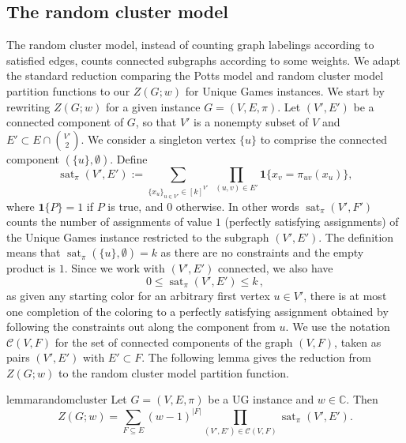 \documentclass[10pt,a4paper]{article}
\theoremstyle{definition}
\newcommand*{\comp}{\mathcal{C}}
\DeclareMathOperator{\sat}{sat}
\newcommand*{\indicator}[1]{\mathbf{1}\bm{\{}#1\bm{\}}}
\newcommand*{\CC}{\mathbb{C}}
\begin{document}
\subsection{The random cluster model}
%
The random cluster model, instead of counting graph labelings according to satisfied edges, counts connected subgraphs according to some weights. 
We adapt the standard reduction comparing the Potts model and random cluster model partition functions to our $Z(G;w)$ for Unique Games instances.
%
We start by rewriting $Z(G;w)$ for a given instance $G=(V,E,\pi)$. 
Let $(V',E')$ be a connected component of $G$, so that $V'$ is a nonempty subset of $V$ and $E'\subset E\cap \binom{V'}{2}$. 
We consider a singleton vertex $\{u\}$ to comprise the connected component $(\{u\},\emptyset)$. 
Define
\[
\sat_\pi(V',E'):=\sum_{\{x_u\}_{u\in V'}\in[k]^{V'}}\;\prod_{(u,v)\in E'}\indicator{x_v=\pi_{uv}(x_u)},
\]
where $\indicator{P}=1$ if $P$ is true, and $0$ otherwise. 
In other words $\sat_\pi(V',F')$ counts the number of assignments of value $1$ (perfectly satisfying assignments) of the Unique Games instance restricted to the subgraph $(V',E')$. 
The definition means that $\sat_\pi(\{u\},\emptyset)=k$ as there are no constraints and the empty product is $1$.
Since we work with $(V',E')$ connected, we also have 
\begin{equation}\label{eq:con}
0\le \sat_\pi(V', E')\le k\,,
\end{equation}
as given any starting color for an arbitrary first vertex $u\in V'$, there is at most one completion of the coloring to a perfectly satisfying assignment obtained by following the constraints out along the component from $u$. 
%
We use the notation $\comp(V, F)$ for the set of connected components of the graph $(V, F)$, taken as pairs $(V', E')$ with $E'\subset F$. 
The following lemma gives the reduction from $Z(G;w)$ to the random cluster model partition function.
%
%
\begin{restatable}{lemma}{randomcluster}\label{lem:random cluster}
Let $G=(V,E,\pi)$ be a UG instance and $w\in\CC$.
Then 
\[
Z(G;w)=\sum_{F\subseteq E} (w-1)^{|F|} \prod_{(V',E')\in\comp(V,F)} \sat_{\pi}(V',E').
\]
\end{restatable}
%

%
\end{document}
